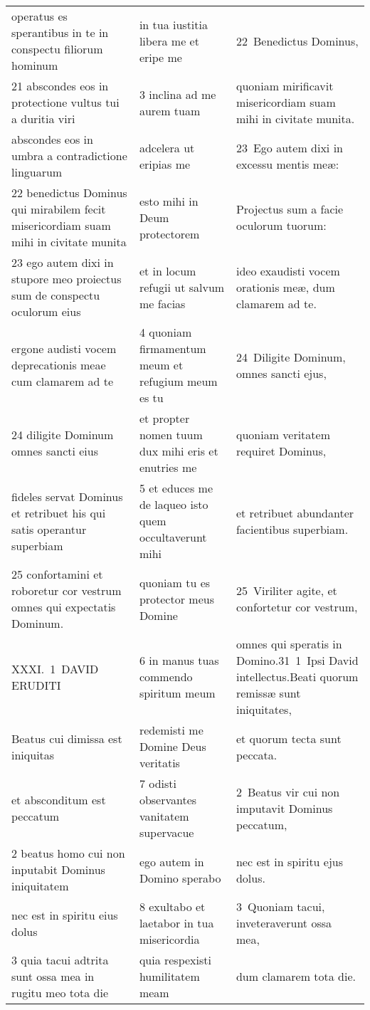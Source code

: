 \documentclass{article}
\begin{document}
\begin{longtable}{@{}p{}p{}p{}@{}}
operatus es sperantibus in te in conspectu filiorum hominum	&	in tua iustitia libera me et eripe me	&	22 Benedictus Dominus,	\\
21 abscondes eos in protectione vultus tui a duritia viri	&	3 inclina ad me aurem tuam	&	quoniam mirificavit misericordiam suam mihi in civitate munita.	\\
abscondes eos in umbra a contradictione linguarum	&	adcelera ut eripias me	&	23 Ego autem dixi in excessu mentis meæ:	\\
22 benedictus Dominus qui mirabilem fecit misericordiam suam mihi in civitate munita	&	esto mihi in Deum protectorem	&	Projectus sum a facie oculorum tuorum:	\\
23 ego autem dixi in stupore meo proiectus sum de conspectu oculorum eius	&	et in locum refugii ut salvum me facias	&	ideo exaudisti vocem orationis meæ, dum clamarem ad te.	\\
ergone audisti vocem deprecationis meae cum clamarem ad te	&	4 quoniam firmamentum meum et refugium meum es tu	&	24 Diligite Dominum, omnes sancti ejus,	\\
24 diligite Dominum omnes sancti eius	&	et propter nomen tuum dux mihi eris et enutries me	&	quoniam veritatem requiret Dominus,	\\
fideles servat Dominus et retribuet his qui satis operantur superbiam	&	5 et educes me de laqueo isto quem occultaverunt mihi	&	et retribuet abundanter facientibus superbiam.	\\
25 confortamini et roboretur cor vestrum omnes qui expectatis Dominum.	&	quoniam tu es protector meus Domine	&	25 Viriliter agite, et confortetur cor vestrum,	\\
XXXI. 1 DAVID ERUDITI	&	6 in manus tuas commendo spiritum meum	&	omnes qui speratis in Domino.31 1 Ipsi David intellectus.Beati quorum remissæ sunt iniquitates,	\\
Beatus cui dimissa est iniquitas	&	redemisti me Domine Deus veritatis	&	et quorum tecta sunt peccata.	\\
et absconditum est peccatum	&	7 odisti observantes vanitatem supervacue	&	2 Beatus vir cui non imputavit Dominus peccatum,	\\
2 beatus homo cui non inputabit Dominus iniquitatem	&	ego autem in Domino sperabo	&	nec est in spiritu ejus dolus.	\\
nec est in spiritu eius dolus	&	8 exultabo et laetabor in tua misericordia	&	3 Quoniam tacui, inveteraverunt ossa mea,	\\
3 quia tacui adtrita sunt ossa mea in rugitu meo tota die	&	quia respexisti humilitatem meam	&	dum clamarem tota die.	\\

\end{longtable}
\end{document}

